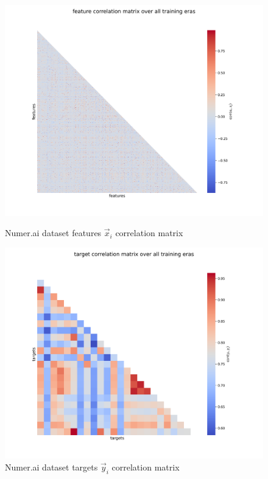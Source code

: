 \documentclass[12pt, a4paper]{article}
\begin{document}
\begin{figure}[htbp]
\begin{minipage}[t]{9cm}
\vspace{0pt}
    \centering
    \includegraphics[width=1\textwidth,trim={0 0 0 0},clip]{figures/feature_correlations_matrix_2023-11-18.png}
    \caption[Numer.ai dataset features $\vec{x}_i$ correlation matrix]{Numer.ai dataset features $\vec{x}_i$ correlation matrix}
    \label{fig: numerai_features_correlation_matrix}
\end{minipage}
\hfill
\begin{minipage}[t]{9cm}
\vspace{0pt}
    \centering
    \includegraphics[width=1\textwidth,trim={0 0 0 0},clip]{figures/target_correlations_matrix_2023-11-18.png}
    \caption[Numer.ai dataset targets $\vec{y}_i$ correlation matrix]{Numer.ai dataset targets $\vec{y}_i$ correlation matrix}
    \label{fig: numerai_targets_correlation_matrix}
\end{minipage}
\end{figure}
\end{document}
